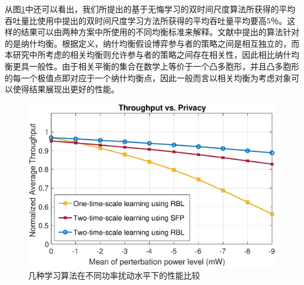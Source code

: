 从图\ref{fg:Fig33}中还可以看出，我们所提出的基于无悔学习的双时间尺度算法所获得的平均吞吐量比使用\cite{ZhangGlobe}中提出的双时间尺度学习方法所获得的平均吞吐量平均要高5％。这样的结果可以由两种方案中所使用的不同均衡标准来解释。文献\cite{ZhangGlobe}中提出的算法针对的是纳什均衡。根据定义，纳什均衡假设博弈参与者的策略之间是相互独立的，而本研究中所考虑的相关均衡则允许参与者的策略之间存在相关性，因此相比纳什均衡更具一般性。由于相关平衡的集合在数学上等价于一个凸多胞形，并且凸多胞形的每一个极值点即对应于一个纳什均衡点，因此一般而言以相关均衡为考虑对象可以使得结果展现出更好的性能。
\begin{figure}[htb]
\centering
\includegraphics[scale=0.58]{./pic/thp_pert_new3.eps}
\caption{几种学习算法在不同功率扰动水平下的性能比较}\label{fg:Fig33}
\end{figure}
